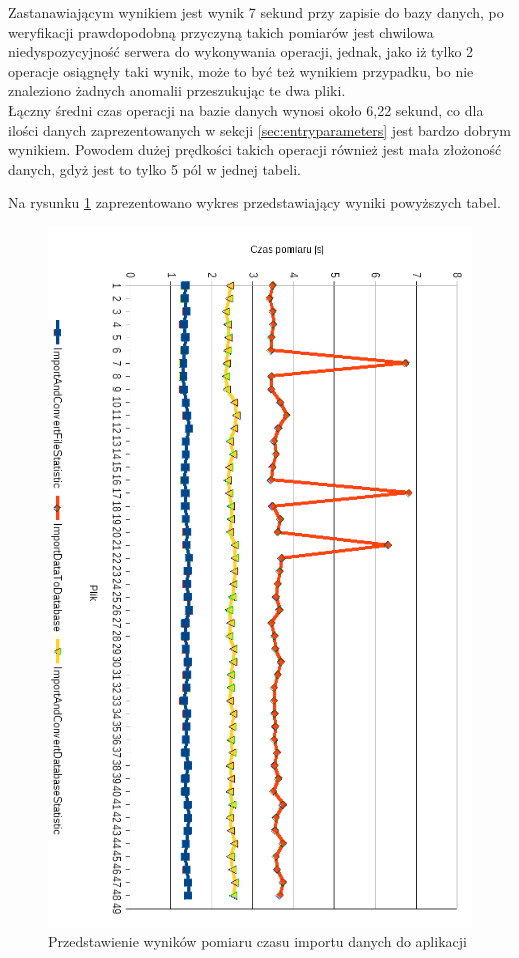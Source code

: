 Zastanawiającym wynikiem jest wynik 7 sekund przy zapisie do bazy danych, po weryfikacji prawdopodobną przyczyną takich pomiarów jest chwilowa niedyspozycyjność serwera do wykonywania operacji, jednak, jako iż tylko 2 operacje osiągnęły taki wynik, może to być też wynikiem przypadku, bo nie znaleziono żadnych anomalii przeszukując te dwa pliki.\\
Łączny średni czas operacji na bazie danych wynosi około 6,22 sekund, co dla ilości danych zaprezentowanych w sekcji \ref{sec:entryparameters} jest bardzo dobrym wynikiem. Powodem dużej prędkości takich operacji również jest mała złożoność danych, gdyż jest to tylko 5 pól w jednej tabeli.\par
Na rysunku \ref{fig:importdata} zaprezentowano wykres przedstawiający wyniki powyższych tabel.
\newpage
\begin{figure}[H]
    \centering
    \captionsetup{justification=centering,margin=2cm}
    \includegraphics[width=\linewidth]{resources/statystyka_pomiaru.png}
    \caption{Przedstawienie wyników pomiaru czasu importu danych do aplikacji}
    \label{fig:importdata}
\end{figure}
